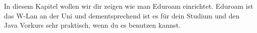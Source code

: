 

In diesem Kapitel wollen wir dir zeigen wie man Eduroam einrichtet. Eduroam ist das W-Lan an der Uni und dementsprechend ist es für dein Studium und den Java Vorkurs sehr praktisch, wenn du es benutzen kannst.

\addexcercise
\addexcercise